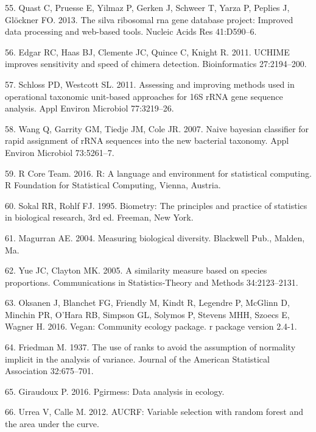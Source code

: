 \documentclass[12pt,]{article}
\begin{document}
\hypertarget{ref-Quast_silva_2013}{}
55. Quast C, Pruesse E, Yilmaz P, Gerken J, Schweer T, Yarza P, Peplies
J, Glöckner FO. 2013. The silva ribosomal rna gene database project:
Improved data processing and web-based tools. Nucleic Acids Res
41:D590--6.

\hypertarget{ref-edgar_uchime_2011}{}
56. Edgar RC, Haas BJ, Clemente JC, Quince C, Knight R. 2011. UCHIME
improves sensitivity and speed of chimera detection. Bioinformatics
27:2194--200.

\hypertarget{ref-schloss_OTUanalysis_2011}{}
57. Schloss PD, Westcott SL. 2011. Assessing and improving methods used
in operational taxonomic unit-based approaches for 16S rRNA gene
sequence analysis. Appl Environ Microbiol 77:3219--26.

\hypertarget{ref-wang_taxonomy_2007}{}
58. Wang Q, Garrity GM, Tiedje JM, Cole JR. 2007. Naive bayesian
classifier for rapid assignment of rRNA sequences into the new bacterial
taxonomy. Appl Environ Microbiol 73:5261--7.

\hypertarget{ref-R}{}
59. R Core Team. 2016. R: A language and environment for statistical
computing. R Foundation for Statistical Computing, Vienna, Austria.

\hypertarget{ref-sokal_biometrystats_1995}{}
60. Sokal RR, Rohlf FJ. 1995. Biometry: The principles and practice of
statistics in biological research, 3rd ed. Freeman, New York.

\hypertarget{ref-magurran_measuring_2004}{}
61. Magurran AE. 2004. Measuring biological diversity. Blackwell Pub.,
Malden, Ma.

\hypertarget{ref-yue_thetaYC_2005}{}
62. Yue JC, Clayton MK. 2005. A similarity measure based on species
proportions. Communications in Statistics-Theory and Methods
34:2123--2131.

\hypertarget{ref-oksanen_vegan_2016}{}
63. Oksanen J, Blanchet FG, Friendly M, Kindt R, Legendre P, McGlinn D,
Minchin PR, O'Hara RB, Simpson GL, Solymos P, Stevens MHH, Szoecs E,
Wagner H. 2016. Vegan: Community ecology package. r package version
2.4-1.

\hypertarget{ref-friedman_1937}{}
64. Friedman M. 1937. The use of ranks to avoid the assumption of
normality implicit in the analysis of variance. Journal of the American
Statistical Association 32:675--701.

\hypertarget{ref-pgirmess}{}
65. Giraudoux P. 2016. Pgirmess: Data analysis in ecology.

\hypertarget{ref-AUCRF}{}
66. Urrea V, Calle M. 2012. AUCRF: Variable selection with random forest
and the area under the curve.
\end{document}
